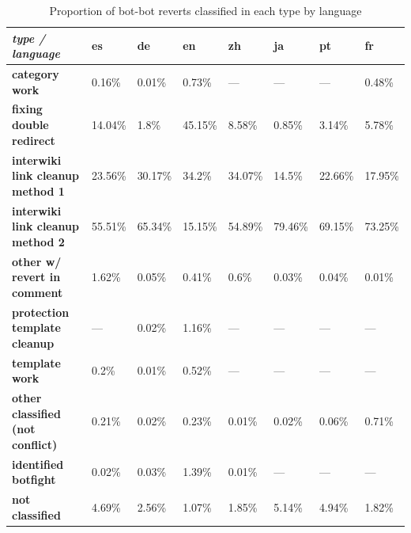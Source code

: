 \documentclass[format=acmsmall, review=false, screen=true]{acmart}%
\begin{document}
\begin{table}[h]
\centering
\begin{tabular}{|l|l|l|l|l|l|l|l|}
\hline
\textbf{\textit{type / language}}                   & \textbf{es} & \textbf{de} & \textbf{en} & \textbf{zh} & \textbf{ja} & \textbf{pt} & \textbf{fr} \\ \hline
\textbf{category work}                     & 0.16\%      & 0.01\%      & 0.73\%      & ---         & ---         & ---         & 0.48\%      \\ \hline
\textbf{fixing double redirect}            & 14.04\%     & 1.8\%       & 45.15\%     & 8.58\%      & 0.85\%      & 3.14\%      & 5.78\%      \\ \hline
\textbf{interwiki link cleanup method 1} & 23.56\%     & 30.17\%     & 34.2\%      & 34.07\%     & 14.5\%      & 22.66\%     & 17.95\%     \\ \hline
\textbf{interwiki link cleanup method 2} & 55.51\%     & 65.34\%     & 15.15\%     & 54.89\%     & 79.46\%     & 69.15\%     & 73.25\%     \\ \hline
\textbf{other w/ revert in comment}        & 1.62\%      & 0.05\%      & 0.41\%      & 0.6\%       & 0.03\%      & 0.04\%      & 0.01\%      \\ \hline
\textbf{protection template cleanup}       & ---         & 0.02\%      & 1.16\%      & ---         & ---         & ---         & ---         \\ \hline
\textbf{template work}                     & 0.2\%       & 0.01\%      & 0.52\%      & ---         & ---         & ---         & ---         \\ \hline
\textbf{other classified (not conflict)}                  & 0.21\%      & 0.02\%      & 0.23\%      & 0.01\%      & 0.02\%      & 0.06\%      & 0.71\%      \\ \hline
\textbf{identified botfight}                          & 0.02\%      & 0.03\%      & 1.39\%      & 0.01\%      & ---         & ---       & ---       \\ \hline
\textbf{not classified}                    & 4.69\%      & 2.56\%      & 1.07\%      & 1.85\%      & 5.14\%      & 4.94\%      & 1.82\%      \\ \hline
\end{tabular}
\caption{Proportion of bot-bot reverts classified in each type by language}
\label{table-type-prop}
\end{table}
\end{document}
